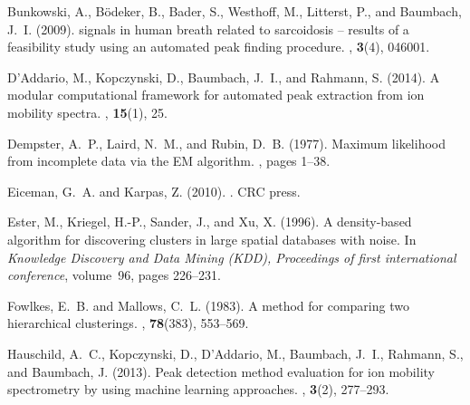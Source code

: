 \documentclass{article}
\begin{document}
\begin{thebibliography}{}
Bunkowski, A., B{\"o}deker, B., Bader, S., Westhoff, M., Litterst, P., and
  Baumbach, J.~I. (2009).
 signals in human breath related to sarcoidosis -- results
  of a feasibility study using an automated peak finding procedure.
, {\bf 3}(4), 046001.

D'Addario, M., Kopczynski, D., Baumbach, J.~I., and Rahmann, S. (2014).
\newblock A modular computational framework for automated peak extraction from
  ion mobility spectra.
, {\bf 15}(1), 25.

Dempster, A.~P., Laird, N.~M., and Rubin, D.~B. (1977).
\newblock Maximum likelihood from incomplete data via the {EM} algorithm.
, pages 1--38.

Eiceman, G.~A. and Karpas, Z. (2010).
.
\newblock CRC press.

Ester, M., Kriegel, H.-P., Sander, J., and Xu, X. (1996).
\newblock A density-based algorithm for discovering clusters in large spatial
  databases with noise.
\newblock In {\em Knowledge Discovery and Data Mining (KDD), Proceedings of
  first international conference\/}, volume~96, pages 226--231.

Fowlkes, E.~B. and Mallows, C.~L. (1983).
\newblock A method for comparing two hierarchical clusterings.
, {\bf
  78}(383), 553--569.

Hauschild, A.~C., Kopczynski, D., D'Addario, M., Baumbach, J.~I., Rahmann, S.,
  and Baumbach, J. (2013).
\newblock Peak detection method evaluation for ion mobility spectrometry by
  using machine learning approaches.
, {\bf 3}(2), 277--293.


\end{thebibliography}
\end{document}
